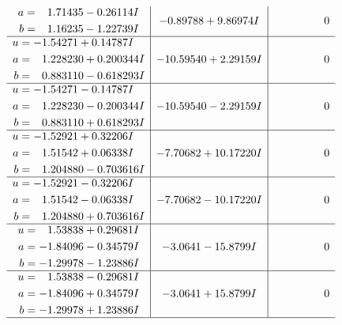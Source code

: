 \documentclass[1p]{elsarticle_modified}
\theoremstyle{definition}
\begin{document}
$$\begin{array}{c|c|c}
\begin{aligned}
a &= \phantom{-}1.71435 - 0.26114 I \\
b &= \phantom{-}1.16235 - 1.22739 I\end{aligned}
 & -0.89788 + 9.86974 I & \phantom{-0.000000 } 0 \\ \hline\begin{aligned}
u &= -1.54271 + 0.14787 I \\
a &= \phantom{-}1.228230 + 0.200344 I \\
b &= \phantom{-}0.883110 - 0.618293 I\end{aligned}
 & -10.59540 + 2.29159 I & \phantom{-0.000000 } 0 \\ \hline\begin{aligned}
u &= -1.54271 - 0.14787 I \\
a &= \phantom{-}1.228230 - 0.200344 I \\
b &= \phantom{-}0.883110 + 0.618293 I\end{aligned}
 & -10.59540 - 2.29159 I & \phantom{-0.000000 } 0 \\ \hline\begin{aligned}
u &= -1.52921 + 0.32206 I \\
a &= \phantom{-}1.51542 + 0.06338 I \\
b &= \phantom{-}1.204880 - 0.703616 I\end{aligned}
 & -7.70682 + 10.17220 I & \phantom{-0.000000 } 0 \\ \hline\begin{aligned}
u &= -1.52921 - 0.32206 I \\
a &= \phantom{-}1.51542 - 0.06338 I \\
b &= \phantom{-}1.204880 + 0.703616 I\end{aligned}
 & -7.70682 - 10.17220 I & \phantom{-0.000000 } 0 \\ \hline\begin{aligned}
u &= \phantom{-}1.53838 + 0.29681 I \\
a &= -1.84096 - 0.34579 I \\
b &= -1.29978 - 1.23886 I\end{aligned}
 & -3.0641 - 15.8799 I & \phantom{-0.000000 } 0 \\ \hline\begin{aligned}
u &= \phantom{-}1.53838 - 0.29681 I \\
a &= -1.84096 + 0.34579 I \\
b &= -1.29978 + 1.23886 I\end{aligned}
 & -3.0641 + 15.8799 I & \phantom{-0.000000 } 0\\
 \hline 

\end{array}$$
\end{document}
